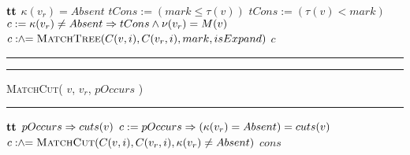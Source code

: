 \begin{algorithm}[h!]
\begin{algorithmic}[1]
     \Return $\mathbf{tt}$ \EndIf
    \label{line:matchtree-vr-absent}
     \Return $\kappa(v_r) = Absent$ \EndIf
    \label{line:matchtree-v-absent}
      \State $tCons := ( mark \leq \tau(v) )$
    \Else
      \State $tCons := ( \tau(v) < mark ) $
    \EndIf
    \State $c := \kappa(v_r) \neq Absent \Rightarrow tCons \land \nu(v_r)= M(v) $
    \label{line:matchtree-cons}
    \State\hspace{-2ex} $c \mathrel{:\hspace{-3pt}\land\hspace{-3pt}=} \textsc{MatchTree}( C(v,i), C(v_r,i), mark, isExpand)$
    \label{line:matchtree-recurse}
    \EndFor
    \State \Return $c$   
  \end{algorithmic}
  \hrule
  \vspace{3ex}
  \hrule\vspace{2pt}
  \textsc{MatchCut}( $v$, $v_r$, $pOccurs$ )\hfill\mbox{}
  \vspace{2pt}\hrule
  \begin{algorithmic}[1]
     \Return $\mathbf{tt}$ \EndIf
    \label{line:mcut-no-v}
     \Return $pOccurs \Rightarrow cuts(v)$ \EndIf
    \label{line:mcut-no-vr}
    \State $c := pOccurs \Rightarrow ( \kappa(v_r) = Absent) = cuts(v)$
    \label{line:mcut-cons}
    \State \hspace{-1.5ex}$c \mathrel{:\hspace{-3pt}\land\hspace{-3pt}=} \textsc{MatchCut}( C(v,i), C(v_r,i), \kappa(v_r) \neq Absent)$
    \label{line:mcut-kids}
    \EndFor
    \State \Return $cons$
  \end{algorithmic}      

\end{algorithm}


